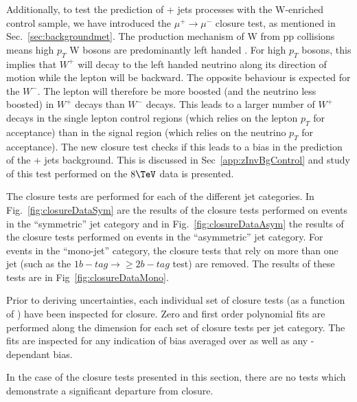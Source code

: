 Additionally, to test the prediction of \znunu + jets processes with
the W-enriched \mj control sample, we have introduced the
$\mu^{+}\rightarrow\mu^{-}$ closure test, as mentioned in
Sec.~\ref{sec:backgroundmet}. The production mechanism of W from pp collisions means
high $p_T$ W bosons are predominantly left handed \cite{WPol}.  
For high $p_T$ bosons, this implies that $W^+$ will decay 
to the left handed neutrino along its direction of motion while 
the lepton will be backward. The opposite behaviour is
expected for the $W^-$. The lepton will therefore be more boosted (and
the neutrino less boosted) in $W^+$ decays than $W^-$ decays.  This
leads to a larger number of $W^+$ decays in the single lepton control
regions (which relies on the lepton $p_T$ for acceptance) than in the
signal region (which relies on the neutrino $p_T$ for acceptance). The
new closure test checks if this leads to a bias in the prediction of the 
\znunu + jets background. This is discussed in
Sec~\ref{app:zInvBgControl} and study of this test performed on the
$8\tev$ data is presented.

The closure tests are performed for each of the different jet
categories. In Fig.~\ref{fig:closureDataSym} are the results of the
closure tests performed on events in the ``symmetric'' jet category
and in Fig.~\ref{fig:closureDataAsym} the results of the closure tests
performed on events in the ``asymmetric'' jet
category. For events in the ``mono-jet'' category, the closure tests
that rely on more than one jet (such as the $1 b-tag\rightarrow\geq 2
b-tag$ test) are removed. The results of these tests are in
Fig~\ref{fig:closureDataMono}.

Prior to deriving uncertainties, each individual set of closure tests
(as a function of \scalht) have been inspected for closure. Zero and first order
polynomial fits are performed along the \scalht dimension for each set
of closure tests per jet category. The fits are inspected for any
indication of bias averaged over \scalht as well as any
\scalht-dependant bias.

In the case of the closure tests presented in this section, there are
no tests which demonstrate a significant departure from closure. 

